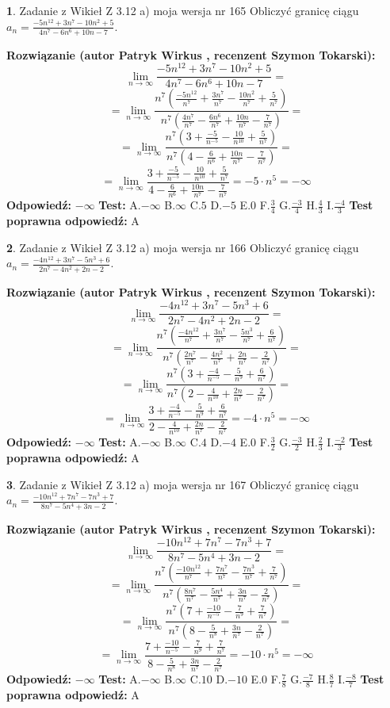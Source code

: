 \documentclass[12pt, a4paper]{article}
\theoremstyle{definition} %
\newtheorem{zad}{}
\newcommand{\zadStart}[1]{\begin{zad}#1\newline}
\newcommand{\zadStop}{\end{zad}}
\newcommand{\rozwStart}[2]{\noindent \textbf{Rozwiązanie (autor #1 , recenzent #2): }\newline}
\newcommand{\rozwStop}{\newline}
\newcommand{\odpStart}{\noindent \textbf{Odpowiedź:}\newline}
\newcommand{\odpStop}{\newline}
\newcommand{\testStart}{\noindent \textbf{Test:}\newline}
\newcommand{\testStop}{\newline}
\newcommand{\kluczStart}{\noindent \textbf{Test poprawna odpowiedź:}\newline}
\newcommand{\kluczStop}{\newline}
\begin{document}
\zadStart{Zadanie z Wikieł Z 3.12 a) moja wersja nr 165}
Obliczyć granicę ciągu $a_{n}=\frac{-5n^{12}+3n^{7}-10n^{2}+5}{4n^{7}-6n^{6}+10n-7}$.
\zadStop
\rozwStart{Patryk Wirkus}{Szymon Tokarski}
$$\lim\limits_{n\to\infty}\frac{-5n^{12}+3n^{7}-10n^{2}+5}{4n^{7}-6n^{6}+10n-7}=$$
$$=\lim\limits_{n\to\infty}\frac{n^{7}\left(\frac{-5n^{12}}{n^{7}}+\frac{3n^{7}}{n^{7}}-\frac{10n^{2}}{n^{7}}+\frac{5}{n^{7}}\right)}{n^{7}\left(\frac{4n^{7}}{n^{7}}-\frac{6n^{6}}{n^{7}}+\frac{10n}{n^{7}}-\frac{7}{n^{7}}\right)}=$$
$$=\lim\limits_{n\to\infty}\frac{n^{7}\left(3+\frac{-5}{n^{-5}}-\frac{10}{n^{10}}+\frac{5}{n^{7}}\right)}
{n^{7}\left(4-\frac{6}{n^{6}}+\frac{10n}{n^{7}}-\frac{7}{n^{7}}\right)}=$$
$$=\lim\limits_{n\to\infty}\frac{3+\frac{-5}{n^{-5}}-\frac{10}{n^{10}}+\frac{5}{n^{7}}}{4-\frac{6}{n^{6}}+\frac{10n}{n^{7}}-\frac{7}{n^{7}}}=-5\cdot n^{5} = -\infty$$
\rozwStop
\odpStart
$-\infty$
\odpStop
\testStart
A.$-\infty$
B.$\infty$
C.$5$
D.$-5$
E.$0$
F.$\frac{3}{4}$
G.$\frac{-3}{4}$
H.$\frac{4}{3}$
I.$\frac{-4}{3}$
\testStop
\kluczStart
A
\kluczStop



\zadStart{Zadanie z Wikieł Z 3.12 a) moja wersja nr 166}
Obliczyć granicę ciągu $a_{n}=\frac{-4n^{12}+3n^{7}-5n^{3}+6}{2n^{7}-4n^{2}+2n-2}$.
\zadStop
\rozwStart{Patryk Wirkus}{Szymon Tokarski}
$$\lim\limits_{n\to\infty}\frac{-4n^{12}+3n^{7}-5n^{3}+6}{2n^{7}-4n^{2}+2n-2}=$$
$$=\lim\limits_{n\to\infty}\frac{n^{7}\left(\frac{-4n^{12}}{n^{7}}+\frac{3n^{7}}{n^{7}}-\frac{5n^{3}}{n^{7}}+\frac{6}{n^{7}}\right)}{n^{7}\left(\frac{2n^{7}}{n^{7}}-\frac{4n^{2}}{n^{7}}+\frac{2n}{n^{7}}-\frac{2}{n^{7}}\right)}=$$
$$=\lim\limits_{n\to\infty}\frac{n^{7}\left(3+\frac{-4}{n^{-5}}-\frac{5}{n^{9}}+\frac{6}{n^{7}}\right)}
{n^{7}\left(2-\frac{4}{n^{10}}+\frac{2n}{n^{7}}-\frac{2}{n^{7}}\right)}=$$
$$=\lim\limits_{n\to\infty}\frac{3+\frac{-4}{n^{-5}}-\frac{5}{n^{9}}+\frac{6}{n^{7}}}{2-\frac{4}{n^{10}}+\frac{2n}{n^{7}}-\frac{2}{n^{7}}}=-4\cdot n^{5} = -\infty$$
\rozwStop
\odpStart
$-\infty$
\odpStop
\testStart
A.$-\infty$
B.$\infty$
C.$4$
D.$-4$
E.$0$
F.$\frac{3}{2}$
G.$\frac{-3}{2}$
H.$\frac{2}{3}$
I.$\frac{-2}{3}$
\testStop
\kluczStart
A
\kluczStop



\zadStart{Zadanie z Wikieł Z 3.12 a) moja wersja nr 167}
Obliczyć granicę ciągu $a_{n}=\frac{-10n^{12}+7n^{7}-7n^{3}+7}{8n^{7}-5n^{4}+3n-2}$.
\zadStop
\rozwStart{Patryk Wirkus}{Szymon Tokarski}
$$\lim\limits_{n\to\infty}\frac{-10n^{12}+7n^{7}-7n^{3}+7}{8n^{7}-5n^{4}+3n-2}=$$
$$=\lim\limits_{n\to\infty}\frac{n^{7}\left(\frac{-10n^{12}}{n^{7}}+\frac{7n^{7}}{n^{7}}-\frac{7n^{3}}{n^{7}}+\frac{7}{n^{7}}\right)}{n^{7}\left(\frac{8n^{7}}{n^{7}}-\frac{5n^{4}}{n^{7}}+\frac{3n}{n^{7}}-\frac{2}{n^{7}}\right)}=$$
$$=\lim\limits_{n\to\infty}\frac{n^{7}\left(7+\frac{-10}{n^{-5}}-\frac{7}{n^{9}}+\frac{7}{n^{7}}\right)}
{n^{7}\left(8-\frac{5}{n^{8}}+\frac{3n}{n^{7}}-\frac{2}{n^{7}}\right)}=$$
$$=\lim\limits_{n\to\infty}\frac{7+\frac{-10}{n^{-5}}-\frac{7}{n^{9}}+\frac{7}{n^{7}}}{8-\frac{5}{n^{8}}+\frac{3n}{n^{7}}-\frac{2}{n^{7}}}=-10\cdot n^{5} = -\infty$$
\rozwStop
\odpStart
$-\infty$
\odpStop
\testStart
A.$-\infty$
B.$\infty$
C.$10$
D.$-10$
E.$0$
F.$\frac{7}{8}$
G.$\frac{-7}{8}$
H.$\frac{8}{7}$
I.$\frac{-8}{7}$
\testStop
\kluczStart
A
\kluczStop
\end{document}
